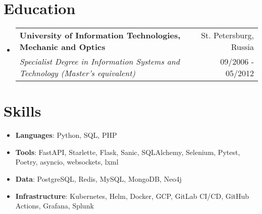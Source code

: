 \documentclass[a4paper,20pt]{article}
\makeatletter
\newcommand{\resumeItem}[2]{
  \item\small{
    \textbf{#1}{: #2 \vspace{-2pt}}
  }
}
\newcommand{\resumeSubheading}[4]{
  \vspace{-1pt}\item
    \begin{tabular*}{0.97\textwidth}{l@{\extracolsep{\fill}}r}
      \textbf{#1} & #2 \\
      \textit{#3} & #4 \\
    \end{tabular*}\vspace{-5pt}
}
\newcommand{\resumeSubItem}[2]{\resumeItem{#1}{#2}\vspace{-3pt}}
\newcommand{\resumeSubHeadingListStart}{\begin{itemize}[leftmargin=*]}
\newcommand{\resumeSubHeadingListEnd}{\end{itemize}}
\newcommand{\sectionPadding}{\vspace{4pt}}
\makeatother
\begin{document}
\section{Education}
    \resumeSubHeadingListStart
        \resumeSubheading
        {University of Information Technologies, Mechanic and Optics}{St. Petersburg, Russia}
        {Specialist Degree in Information Systems and Technology (Master’s equivalent)}{09/2006 - 05/2012}
    \resumeSubHeadingListEnd
\sectionPadding

\section{Skills}
\resumeSubHeadingListStart
	\resumeSubItem{Languages}{\tab\tab Python, SQL, PHP}
	\resumeSubItem{Tools}{\tab\tab\tab\tab  FastAPI, Starlette, Flask, Sanic, SQLAlchemy, Selenium, Pytest, Poetry, asyncio, websockets, lxml}
	\resumeSubItem{Data}{\tab\tab\tab\tab PostgreSQL, Redis, MySQL, MongoDB, Neo4j}
	\resumeSubItem{Infrastructure}{\tab Kubernetes, Helm, Docker, GCP, GitLab CI/CD, GitHub Actions, Grafana, Splunk}
\resumeSubHeadingListEnd
\end{document}

